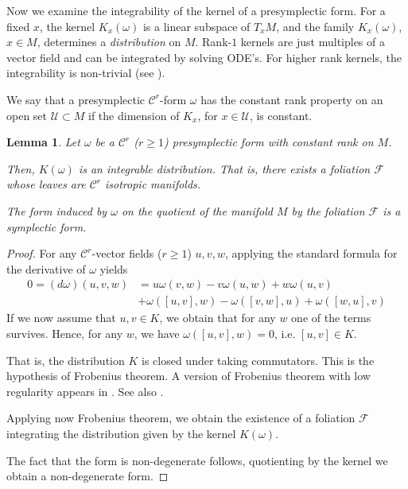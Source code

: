 \documentclass[11pt]{amsart}
\newtheorem{lem}[thm]{Lemma}
\theoremstyle{definition}
\theoremstyle{remark}
\numberwithin{equation}{section}
\newcommand{\C}{\mathcal{C}}
\newcommand{\F}{\mathcal{F}}
\newcommand{\U}{\mathcal{U}}
\begin{document}
Now we examine the integrability of the kernel of  a presymplectic form.
For a fixed $x$, the kernel $K_x (\omega)$ is a linear subspace of $T_x M$, and the family $K_x (\omega)$, $x\in M$, determines a \emph{distribution} on $M$.
Rank-$1$ kernels are just  multiples of a vector field
and can be integrated by solving ODE's. For higher rank kernels, the integrability is
non-trivial (see \cite{LibermannM87,Souriau97,AlishahL12}).

We say that a presymplectic $\C^r$-form $\omega$ has the constant rank property
on an open set $\U \subset M$ if  the dimension of $K_x$, for $x\in \U$,  is constant.







\begin{lem}\label{frobenius}
Let $\omega$ be a $\C^r$ ($r\ge 1$) presymplectic form
with constant rank on $M$.

Then, $K(\omega)$ is an integrable distribution.
That is, there exists a foliation $\F$ whose leaves are
$\C^r$ isotropic manifolds.

The form induced by $\omega$ on the quotient of the manifold $M$
by the foliation $\F$ is  a symplectic form.
\end{lem}

\begin{proof}
For any $\C^r$-vector fields ($r\ge 1$) $u,v,w$, applying the standard formula for  the derivative of $\omega$ yields
\[
\begin{split}
0 = (d\omega)(u,v,w) &=  u \omega(v,w) - v \omega(u,w)   + w \omega(u,v) \\
              & +\omega([u,v],w) - \omega([v,w], u ) + \omega([w,u], v)
\end{split}
\]
If we now assume that $u,v \in K$, we obtain that for any $w$ one of the terms survives.  Hence, for any $w$, we
have $\omega([u,v],w)  = 0$, i.e.
$[u,v] \in K$.

That is, the distribution $K$ is closed under taking commutators.
This is the hypothesis of Frobenius theorem.
A version of Frobenius theorem with low regularity appears in \cite[pp. 123-124]{Hartman}. See also \cite{Yao23}.


Applying now Frobenius theorem, we obtain the existence of a foliation $\mathcal{F}$ integrating the distribution given by the kernel $K(\omega)$.


The fact that the form is non-degenerate follows, quotienting by the kernel we obtain a non-degenerate form.
\end{proof}
\end{document}
